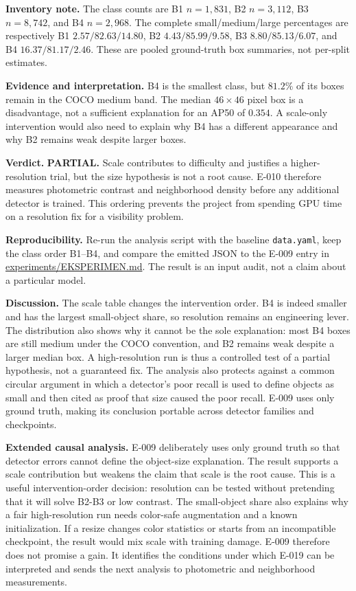 \documentclass[preprint,12pt]{elsarticle}
\newcommand{\pathcode}[1]{\scriptsize\url{#1}}
\begin{document}
\textbf{Inventory note.} The class counts are B1 \(n=1{,}831\), B2
\(n=3{,}112\), B3 \(n=8{,}742\), and B4 \(n=2{,}968\). The complete
small/medium/large percentages are respectively B1 \(2.57/82.63/14.80\),
B2 \(4.43/85.99/9.58\), B3 \(8.80/85.13/6.07\), and B4
\(16.37/81.17/2.46\). These are pooled ground-truth box summaries, not
per-split estimates.

\textbf{Evidence and interpretation.} B4 is the smallest class, but
\(81.2\%\) of its boxes remain in the COCO medium band. The median \(46
\mathbin{\times}46\) pixel box is a disadvantage, not a sufficient
explanation for an AP50 of \(0.354\). A scale-only intervention would also
need to explain why B4 has a different appearance and why B2 remains weak
despite larger boxes.

\textbf{Verdict.} \textbf{PARTIAL.} Scale contributes to difficulty and
justifies a higher-resolution trial, but the size hypothesis is not a root
cause. E-010 therefore measures photometric contrast and neighborhood density
before any additional detector is trained. This ordering prevents the project
from spending GPU time on a resolution fix for a visibility problem.

\textbf{Reproducibility.} Re-run the analysis script with the baseline
\texttt{data.yaml}, keep the class order B1--B4, and compare the emitted JSON
to the E-009 entry in \pathcode{experiments/EKSPERIMEN.md}. The result is
an input audit, not a claim about a particular model.

\textbf{Discussion.} The scale table changes the intervention order. B4 is
indeed smaller and has the largest small-object share, so resolution remains
an engineering lever. The distribution also shows why it cannot be the sole
explanation: most B4 boxes are still medium under the COCO convention, and
B2 remains weak despite a larger median box. A high-resolution run is thus a
controlled test of a partial hypothesis, not a guaranteed fix. The analysis
also protects against a common circular argument in which a detector's poor
recall is used to define objects as small and then cited as proof that size
caused the poor recall. E-009 uses only ground truth, making its conclusion
portable across detector families and checkpoints.

\textbf{Extended causal analysis.} E-009 deliberately uses only ground truth
so that detector errors cannot define the object-size explanation. The result
supports a scale contribution but weakens the claim that scale is the root
cause. This is a useful intervention-order decision: resolution can be tested
without pretending that it will solve B2-B3 or low contrast. The small-object
share also explains why a fair high-resolution run needs color-safe
augmentation and a known initialization. If a resize changes color statistics
or starts from an incompatible checkpoint, the result would mix scale with
training damage. E-009 therefore does not promise a gain. It identifies the
conditions under which E-019 can be interpreted and sends the next analysis to
photometric and neighborhood measurements.
\end{document}
